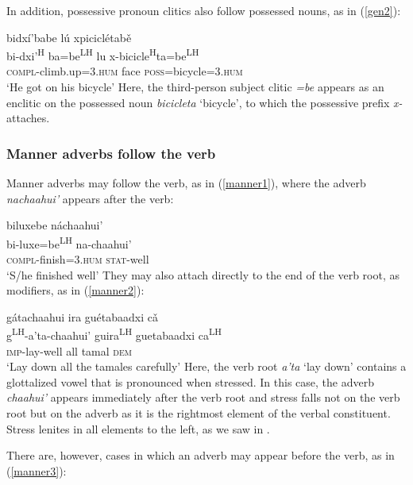In addition, possessive pronoun clitics also follow possessed nouns, as in (\ref{gen2}):

\ea\label{gen2}
\glll bidx\'{i}'babe l\'{u} xpicicl\'{e}tab\v{e} \\
bi-dxi'\textsuperscript{H} ba=be\textsuperscript{LH} lu x-bicicle\textsuperscript{H}ta=be\textsuperscript{LH} \\
\textsc{compl}-climb.up=\textsc{3.hum} face \textsc{poss}=bicycle=\textsc{3.hum} \\
\glt `He got on his bicycle'
\z
Here, the third-person subject clitic \textit{=be} appears as an enclitic on the possessed noun \textit{bicicleta} `bicycle', to which the possessive prefix \textit{x-} attaches.



\subsubsection{Manner adverbs follow the verb}

Manner adverbs may follow the verb, as in (\ref{manner1}), where the adverb \textit{nachaahui'} appears after the verb: 

\ea\label{manner1}
\glll biluxebe n\'{a}chaahui' \\
bi-luxe=be\textsuperscript{LH} na-chaahui' \\
\textsc{compl}-finish=\textsc{3.hum} \textsc{stat}-well \\
\glt `S/he finished well'
\z
They may also attach directly to the end of the verb root, as modifiers, as in (\ref{manner2}):

\ea\label{manner2}
\glll g\'{a}tachaahui ira gu\'{e}tabaadxi c\v{a} \\
g\textsuperscript{LH}-a'ta-chaahui' guira\textsuperscript{LH} guetabaadxi ca\textsuperscript{LH} \\
\textsc{imp}-lay-well all tamal \textsc{dem} \\
\glt `Lay down all the tamales carefully'
\z
Here, the verb root \textit{a'ta} `lay down' contains a glottalized vowel that is pronounced when stressed. In this case, the adverb \textit{chaahui'} appears immediately after the verb root and stress falls not on the verb root but on the adverb as it is the rightmost element of the verbal constituent. Stress lenites in all elements to the left, as we saw in . 

There are, however, cases in which an adverb may appear before the verb, as in (\ref{manner3}):

